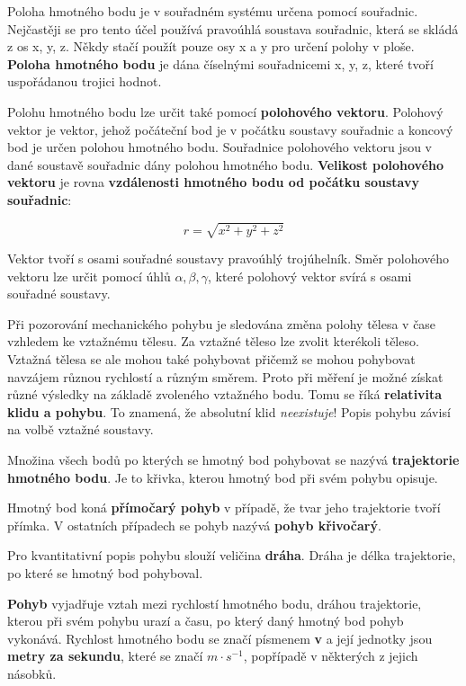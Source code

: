 Poloha hmotného bodu je v souřadném systému určena pomocí souřadnic. Nejčastěji se pro tento účel používá pravoúhlá soustava souřadnic, která se skládá z os x, y, z. Někdy stačí použít pouze osy x a y pro určení polohy v ploše. {\bf Poloha hmotného bodu} je dána číselnými souřadnicemi x, y, z, které tvoří uspořádanou trojici hodnot.

Polohu hmotného bodu lze určit také pomocí {\bf polohového vektoru}. Polohový vektor je vektor, jehož počáteční bod je v počátku soustavy souřadnic a koncový bod je určen polohou hmotného bodu. Souřadnice polohového vektoru jsou v dané soustavě souřadnic dány polohou hmotného bodu. {\bf Velikost polohového vektoru} je rovna {\bf vzdálenosti hmotného bodu od počátku soustavy souřadnic}:

$$ r = \sqrt{x^2 + y^2 + z^2} $$

Vektor tvoří s osami souřadné soustavy pravoúhlý trojúhelník. Směr polohového vektoru lze určit pomocí úhlů $\alpha, \beta, \gamma$, které polohový vektor svírá s osami souřadné soustavy.



Při pozorování mechanického pohybu je sledována změna polohy tělesa v čase vzhledem ke vztažnému tělesu. Za vztažné těleso lze zvolit kterékoli těleso. Vztažná tělesa se ale mohou také pohybovat přičemž se mohou pohybovat navzájem různou rychlostí a různým směrem. Proto při měření je možné získat různé výsledky na základě zvoleného vztažného bodu. Tomu se říká {\bf relativita klidu a pohybu}. To znamená, že absolutní klid {\it neexistuje}! Popis pohybu závisí na volbě vztažné soustavy. 

Množina všech bodů po kterých se hmotný bod pohybovat se nazývá {\bf trajektorie hmotného bodu}. Je to křivka, kterou hmotný bod při svém pohybu opisuje. 

Hmotný bod koná {\bf přímočarý pohyb} v případě, že tvar jeho trajektorie tvoří přímka. V ostatních případech se pohyb nazývá {\bf pohyb křivočarý}. 

Pro kvantitativní popis pohybu slouží veličina {\bf dráha}. Dráha je délka trajektorie, po které se hmotný bod pohyboval. 

{\bf Pohyb} vyjadřuje vztah mezi rychlostí hmotného bodu, dráhou trajektorie, kterou při svém pohybu urazí a času, po který daný hmotný bod pohyb vykonává. Rychlost hmotného bodu se značí písmenem {\bf v} a její jednotky jsou {\bf metry za sekundu}, které se značí $m\cdot s^{-1}$, popřípadě v některých z jejich násobků.

